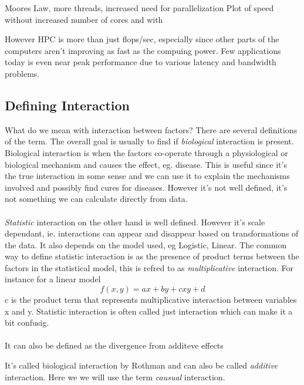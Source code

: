 \documentclass[10pt,a4paper]{article}
\begin{document}
Moores Law, more threads, increased need for parallelization
Plot of speed without increased number of cores and with

However HPC is more than just flops/sec, especially since other parts of the computers aren't improving as fast as the compuing power. Few applications today is even near peak performance due to various latency and bandwidth problems.

\subsection{Defining Interaction}
What do we mean with interaction between factors? There are several definitions of the term\cite{rothman2002intro_epidemiology}. The overall goal is usually to find if \emph{biological} interaction is present. Biological interaction is when the factors co-operate through a physiological or biological mechanism and causes the effect, eg. disease. This is useful since it's the true interaction in some sense and we can use it to explain the mechanisms involved and possibly find cures for diseases. However it's not well defined, it's not something we can calculate directly from data.\cite{rothman1998modern,rothman2002intro_epidemiology}\\
\\
\emph{Statistic} interaction on the other hand is well defined. However it's scale dependant, ie. interactions can appear and disappear based on transformations of the data. It also depends on the model used, eg Logistic, Linear. The common way to define statistic interaction is as the presence of product terms between the factors in the statistical model, this is refred to as \emph{multiplicative} interaction. For instance for a linear model
$$f(x,y)=ax+by+cxy+d$$
c is the product term that represents multiplicative interaction between variables x and y. Statistic interaction is often called just interaction which can make it a  bit confusig.\cite{geira,rothman1998modern}\\
\\
It can also be defined as the divergence from additeve effects

It's called biological interaction by Rothman\cite{rothman1998modern} and can also be called \emph{additive} interaction\cite{geira}. Here we we will use the term \emph{causual} interaction\cite{causal_bounds_arvid}.\\

\end{document}
